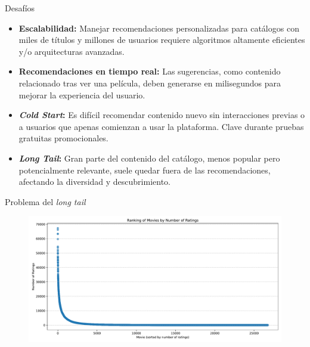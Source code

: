 \documentclass{beamer}
\begin{document}
\begin{frame}{Desafíos}
    \pause
    \begin{itemize}
        \item \textbf{Escalabilidad:} 
        Manejar recomendaciones personalizadas para catálogos con miles de títulos y millones de usuarios requiere algoritmos altamente eficientes y/o arquitecturas avanzadas.
        \pause
        \item \textbf{Recomendaciones en tiempo real:} 
        Las sugerencias, como contenido relacionado tras ver una película, deben generarse en milisegundos para mejorar la experiencia del usuario.
        \pause
        \item \textbf{\textit{Cold Start}:} 
        Es difícil recomendar contenido nuevo sin interacciones previas o a usuarios que apenas comienzan a usar la plataforma. Clave durante pruebas gratuitas promocionales.
        \pause
        \item \textbf{\textit{Long Tail}:} 
        Gran parte del contenido del catálogo, menos popular pero potencialmente relevante, suele quedar fuera de las recomendaciones, afectando la diversidad y descubrimiento.
        
        
    \end{itemize}
\end{frame}

\begin{frame}{Problema del \textit{long tail}}
    \begin{figure}
        \centering
        \includegraphics[width=\textwidth]{images/ranking_of_movies_by_ratings.pdf}
    \end{figure}
\end{frame}

\end{document}
